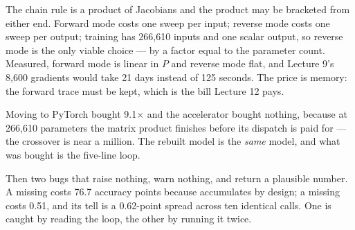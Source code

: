 \documentclass[11pt,a4paper]{article}
\begin{document}
The chain rule is a product of Jacobians and the product may be bracketed from
either end. Forward mode costs one sweep per input; reverse mode costs one
sweep per output; training has 266{,}610 inputs and one scalar output, so
reverse mode is the only viable choice --- by a factor equal to the parameter
count. Measured, forward mode is linear in $P$ and reverse mode flat, and
Lecture 9's 8{,}600 gradients would take 21 days instead of 125 seconds. The
price is memory: the forward trace must be kept, which is the bill Lecture 12
pays.

Moving to PyTorch bought 9.1$\times$ and the accelerator bought nothing,
because at 266{,}610 parameters the matrix product finishes before its dispatch
is paid for --- the crossover is near a million. The rebuilt model is the
\emph{same} model, and what was bought is the five-line loop.

Then two bugs that raise nothing, warn nothing, and return a plausible number.
A missing  costs 76.7 accuracy points because
 accumulates by design; a missing  costs
0.51, and its tell is a 0.62-point spread across ten identical calls. One is
caught by reading the loop, the other by running it twice.
\end{document}
